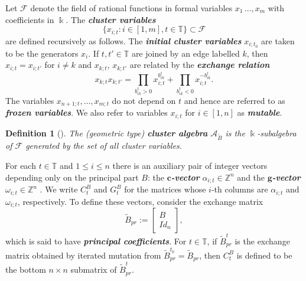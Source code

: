 \documentclass[12pt]{amsart}
\newcommand{\newword}[1]{\textbf{\emph{#1}}}
\newcommand{\cA}{\mathcal{A}}
\newcommand{\TT}{\mathbb{T}}
\newcommand{\ZZ}{\mathbb{Z}}
\newcommand{\kk}{\Bbbk}
\newcommand{\bfc}{\mathbf{c}}
\newcommand{\bfg}{\mathbf{g}}
\newcommand{\gv}{\omega}
\newcommand{\cv}{\alpha}
\newcommand{\cF}{\mathcal{F}}
\newcommand{\Bpr}{\widetilde{B}_{pr}}
\newtheorem{definition}[theorem]{Definition}
\theoremstyle{remark}
\numberwithin{equation}{section}
\numberwithin{figure}{section}
\begin{document}
Let $\cF$ denote the field of rational functions in formal variables $x_{1}\,\dotsc,x_{m}$ with coefficients in $\kk$.
The \newword{cluster variables}
\[
  \big\{ x_{i;t}: i \in [1,m], t \in\TT\big\} \subset \cF
\]
are defined recursively as follows.
The \newword{initial cluster variables} $x_{i;t_0}$ are taken to be the generators $x_i$.
If $t,t' \in \TT$ are joined by an edge labelled $k$, then $x_{i;t} = x_{i;t'}$ for $i \neq k$ and $x_{k;t}$, $x_{k;t'}$ are related by the \newword{exchange relation} 
\[
  x_{k;t}x_{k;t'} 
  = 
  \prod_{b^t_{ik}>0}x_{i;t}^{b^t_{ik}} 
  + 
  \prod_{b^t_{ik}<0}x_{i;t}^{-b^t_{ik}}.
\]
The variables $x_{n+1;t},\dotsc, x_{m;t}$ do not depend on $t$ and hence are referred to as \newword{frozen variables}.
We also refer to variables $x_{i;t}$ for $i\in[1,n]$ as \newword{mutable}.

\begin{definition}[\cite{FZ02}]
  The (geometric type) \newword{cluster algebra} $\cA_{\widetilde B}$ is the $\kk$-subalgebra of $\cF$ generated by the set of all cluster variables.
\end{definition}

For each $t \in\TT$ and $1 \leq i \leq n$ there is an auxiliary pair of integer vectors depending only on the principal part $B$: the \newword{$\bfc$-vector} $\cv_{i;t} \in \ZZ^n$ and the \newword{$\bfg$-vector} $\gv_{i;t} \in \ZZ^n$ \cite{FZ07}.
We write $C_t^B$ and $G_t^B$ for the matrices whose $i$-th columns are $\cv_{i;t}$ and $\gv_{i;t}$, respectively.
To define these vectors, consider the exchange matrix $$\Bpr := \begin{bmatrix} B \\ Id_n \end{bmatrix},$$ which is said to have \newword{principal coefficients}.
For $t\in\TT$, if $\Bpr^t$ is the exchange matrix obtained by iterated mutation from $\Bpr^{t_0}=\Bpr$, then $C_t^B$ is defined to be the bottom $n \times n$ submatrix of $\Bpr^t$.
\end{document}
